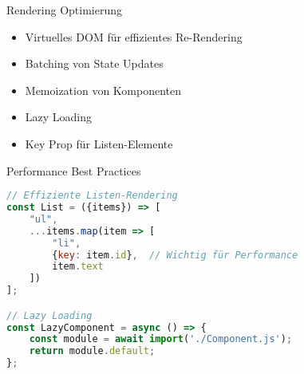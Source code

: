 \begin{concept}{Rendering Optimierung}
    \begin{itemize}
        \item Virtuelles DOM für effizientes Re-Rendering
        \item Batching von State Updates
        \item Memoization von Komponenten
        \item Lazy Loading
        \item Key Prop für Listen-Elemente
    \end{itemize}
\end{concept}

\begin{KR}{Performance Best Practices}
\begin{lstlisting}[language=JavaScript, style=basesmol]
// Effiziente Listen-Rendering
const List = ({items}) => [
    "ul",
    ...items.map(item => [
        "li",
        {key: item.id},  // Wichtig für Performance
        item.text
    ])
];

// Lazy Loading
const LazyComponent = async () => {
    const module = await import('./Component.js');
    return module.default;
};
\end{lstlisting}
\end{KR}